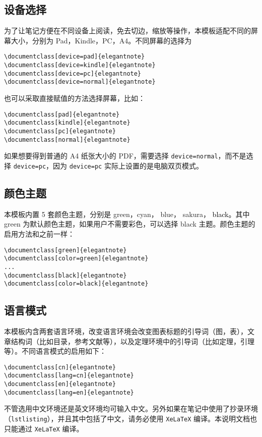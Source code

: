 \documentclass[cn,normal,11pt]{../elegantnote}
\begin{document}
\subsection{设备选择}
为了让笔记方便在不同设备上阅读，免去切边，缩放等操作，本模板适配不同的屏幕大小，分别为 Pad，Kindle，PC，A4。不同屏幕的选择为
\begin{lstlisting}[frame=none]  
\documentclass[device=pad]{elegantnote}
\documentclass[device=kindle]{elegantnote}
\documentclass[device=pc]{elegantnote}
\documentclass[device=normal]{elegantnote}
\end{lstlisting}
\begin{note}
也可以采取直接赋值的方法选择屏幕，比如：
\end{note}
\begin{lstlisting}[frame=none]  
\documentclass[pad]{elegantnote}
\documentclass[kindle]{elegantnote}
\documentclass[pc]{elegantnote}
\documentclass[normal]{elegantnote}
\end{lstlisting}

\begin{note}
如果想要得到普通的 A4 纸张大小的 PDF，需要选择 \lstinline{device=normal}，而不是选择 \lstinline{device=pc}，因为  \lstinline{device=pc} 实际上设置的是电脑双页模式。
\end{note}

\subsection{颜色主题}
本模板内置 5 套颜色主题，分别是 \textcolor{egreen}{green}，\textcolor{ecyan}{cyan}， \textcolor{eblue}{blue}， \textcolor{sakura}{sakura}， \textcolor{black}{black}。其中 green 为默认颜色主题，如果用户不需要彩色，可以选择 black 主题。颜色主题的启用方法和之前一样：
\begin{lstlisting}[frame=none]  
\documentclass[green]{elegantnote}
\documentclass[color=green]{elegantnote}
...
\documentclass[black]{elegantnote}
\documentclass[color=black]{elegantnote}
\end{lstlisting}

\subsection{语言模式}
本模板内含两套语言环境，改变语言环境会改变图表标题的引导词（图，表），文章结构词（比如目录，参考文献等），以及定理环境中的引导词（比如定理，引理等）。不同语言模式的启用如下：
\begin{lstlisting}[frame=none]  
\documentclass[cn]{elegantnote} 
\documentclass[lang=cn]{elegantnote}
\documentclass[en]{elegantnote} 
\documentclass[lang=en]{elegantnote}
\end{lstlisting}
\begin{note}
不管选用中文环境还是英文环境均可输入中文。另外如果在笔记中使用了抄录环境（\lstinline{lstlisting}），并且其中包括了中文，请务必使用 \lstinline{XeLaTeX} 编译。本说明文档也只能通过 \lstinline{XeLaTeX} 编译。
\end{note}
\end{document}
